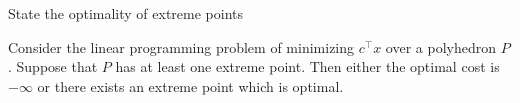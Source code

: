 \documentclass[11pt]{article}
\newcommand{\reals}{\mathbf{R}}
\newcommand*{\xfield}[1]{\begin{mdframed}\centering #1\end{mdframed}\bigskip}
\newenvironment{field}{}{}
\newenvironment{note}{}{}
\begin{document}
%
\begin{note}
  \xfield{State the optimality of extreme points}
  \begin{field}
    Consider the linear programming problem of minimizing \(c^\top x\)
    over a polyhedron \(P\). Suppose that \(P\) has at least one
    extreme point. Then either the optimal cost is \(-\infty\) or
    there exists an extreme point which is optimal.
  \end{field}
\end{note}
%
\end{document}
